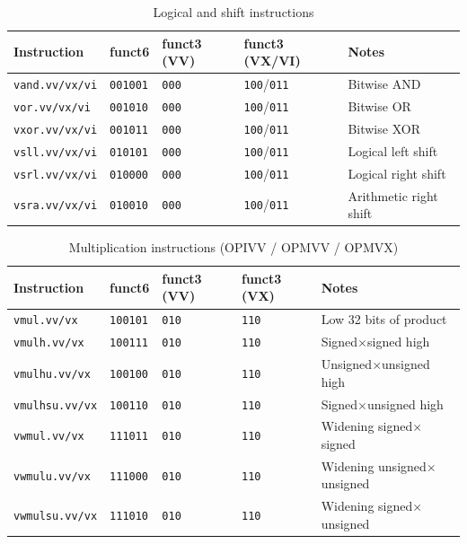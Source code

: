 \begin{table}[H]
  \centering
  \caption{Logical and shift instructions}
  \label{tab:instr-logic}
  \begin{tabular}{@{}lllll@{}}
    \toprule
    \textbf{Instruction} & \textbf{funct6} & \textbf{funct3 (VV)} & \textbf{funct3 (VX/VI)} & \textbf{Notes} \\
    \midrule
    \texttt{vand.vv/vx/vi}  & \texttt{001001} & \texttt{000} & \texttt{100}/\texttt{011} & Bitwise AND \\
    \texttt{vor.vv/vx/vi}   & \texttt{001010} & \texttt{000} & \texttt{100}/\texttt{011} & Bitwise OR \\
    \texttt{vxor.vv/vx/vi}  & \texttt{001011} & \texttt{000} & \texttt{100}/\texttt{011} & Bitwise XOR \\
    \texttt{vsll.vv/vx/vi}  & \texttt{010101} & \texttt{000} & \texttt{100}/\texttt{011} & Logical left shift \\
    \texttt{vsrl.vv/vx/vi}  & \texttt{010000} & \texttt{000} & \texttt{100}/\texttt{011} & Logical right shift \\
    \texttt{vsra.vv/vx/vi}  & \texttt{010010} & \texttt{000} & \texttt{100}/\texttt{011} & Arithmetic right shift \\
    \bottomrule
  \end{tabular}
\end{table}

\begin{table}[H]
  \centering
  \caption{Multiplication instructions (OPIVV / OPMVV / OPMVX)}
  \label{tab:instr-mul}
  \begin{tabular}{@{}lllll@{}}
    \toprule
    \textbf{Instruction} & \textbf{funct6} & \textbf{funct3 (VV)} & \textbf{funct3 (VX)} & \textbf{Notes} \\
    \midrule
    \texttt{vmul.vv/vx}      & \texttt{100101} & \texttt{010} & \texttt{110} & Low 32 bits of product \\
    \texttt{vmulh.vv/vx}     & \texttt{100111} & \texttt{010} & \texttt{110} & Signed$\times$signed high \\
    \texttt{vmulhu.vv/vx}    & \texttt{100100} & \texttt{010} & \texttt{110} & Unsigned$\times$unsigned high \\
    \texttt{vmulhsu.vv/vx}   & \texttt{100110} & \texttt{010} & \texttt{110} & Signed$\times$unsigned high \\
    \texttt{vwmul.vv/vx}     & \texttt{111011} & \texttt{010} & \texttt{110} & Widening signed$\times$signed \\
    \texttt{vwmulu.vv/vx}    & \texttt{111000} & \texttt{010} & \texttt{110} & Widening unsigned$\times$unsigned \\
    \texttt{vwmulsu.vv/vx}   & \texttt{111010} & \texttt{010} & \texttt{110} & Widening signed$\times$unsigned \\
    \bottomrule
  \end{tabular}
\end{table}

